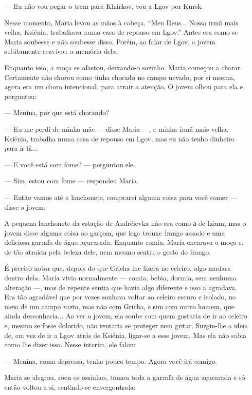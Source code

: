 --- Eu não vou pegar o trem para Khárkov, vou a Lgov por Kursk.

Nesse momento, Maria levou as mãos à cabeça. ``Meu Deus... Nossa irmã
mais velha, Ksiénia, trabalhava numa casa de repouso em Lgov.'' Antes
era como se Maria soubesse e não soubesse disso. Porém, ao falar de
Lgov, o jovem subitamente reavivou a memória dela.

Enquanto isso, a moça se afastou, deixando-o sozinho. Maria começou a
chorar. Certamente não chorou como tinha chorado no campo nevado, por si
mesma, agora era um choro intencional, para atrair a atenção. O jovem
olhou para ela e perguntou:

--- Menina, por que está chorando?

--- Eu me perdi de minha mãe --- disse Maria ---, e minha irmã mais
velha, Ksiénia, trabalha numa casa de repouso em Lgov, mas eu não tenho
dinheiro para ir lá...

--- E você está com fome? --- perguntou ele.

--- Sim, estou com fome --- respondeu Maria.

--- Então vamos até a lanchonete, comprarei alguma coisa para você comer
--- disse o jovem.

A pequena lanchonete da estação de Andréievka não era como а de Izium,
mas o jovem disse alguma coisa ao garçom, que logo trouxe frango assado
e uma deliciosa garrafa de água açucarada. Enquanto comia, Maria
encarava o moço e, de tão atraída pela beleza dele, nem mesmo sentiu o
gosto do frango.

É preciso notar que, depois do que Gricha lhe fizera no celeiro, algo
mudara dentro dela. Maria vivia normalmente --- comia, bebia, dormia,
sem nenhuma alteração ---, mas de repente sentia que havia algo
diferente e isso a agradava. Era tão agradável que por vezes sonhava
voltar ao celeiro escuro e isolado, no meio de um campo vazio, mas não
com Gricha, e sim com outro homem, que ainda desconhecia... Ao ver o
jovem, ela soube com quem gostaria de ir ao celeiro e, mesmo se fosse
dolorido, não tentaria se proteger nem gritar. Surgiu-lhe a ideia de, em
vez de ir a Lgov atrás de Ksiénia, ligar-se a esse jovem. Mas ela não
sabia como lhe dizer isso. Nesse ínterim, ele falou:

--- Menina, coma depressa, tenho pouco tempo. Agora você irá comigo.

Maria se alegrou, roeu os ossinhos, tomou toda a garrafa de água
açucarada e só então voltou a si, sentindo-se envergonhada:

